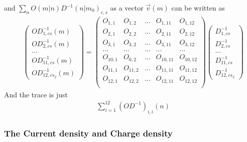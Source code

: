 and $\sum _n O(m|n)D^{-1}(n|m_0)_{c,s}$ as a vector $\vec{v}(m)$ can be written as
\begin{equation}
\begin{split}
&\left(\begin{array}{c} OD^{-1}_{1,cs}(m) \\ OD^{-1}_{2,cs}(m)  \\ \ldots  \\ OD^{-1}_{11,cs}(m) \\ OD^{-1}_{12,cs_2}(m) \end{array}\right)=\left(\begin{array}{ccccc}
O_{1,1} & O_{1,2} & \ldots &  O_{1,11} & O_{1,12} \\
O_{2,1} & O_{2,2} & \ldots &  O_{2,11} & O_{2,12} \\
O_{3,1} & O_{3,2} & \ldots &  O_{3,11} & O_{3,12} \\
\ldots & \ldots & \ldots &  \ldots & \ldots \\
O_{10,1} & O_{0,2} & \ldots & O_{10,11} & O_{10,12} \\
O_{11,1} & O_{11,2} & \ldots & O_{11,11} & O_{11,12} \\
O_{12,1} & O_{12,2} & \ldots &  O_{12,11} & O_{12,12} \\
 \end{array}\right)\left(\begin{array}{c} D^{-1}_{1,cs} \\ D^{-1}_{2,cs} \\ \ldots \\ D^{-1}_{11,cs} \\ D^{-1}_{12,cs_2}\end{array}\right)
\end{split}
\end{equation}
And the trace is just
\begin{equation}
\begin{split}
&\sum _{i=1}^{12}(OD^{-1})_{i,i}(n)
\end{split}
\end{equation}

\subsubsection{\label{sec:RotatingCurrentDensityChargeDensity}The Current density and Charge density}

